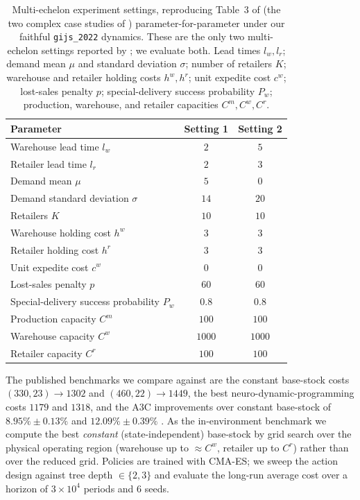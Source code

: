 \documentclass[11pt]{article}
\begin{document}
\begin{table}[!htbp]
\centering
\caption{Multi-echelon experiment settings, reproducing Table~3 of \citet{gijsbrechts2022drl} (the
two complex case studies of \citet{vanroy1997ndp}) parameter-for-parameter under our faithful
\texttt{gijs\_2022} dynamics. These are the only two multi-echelon settings reported by
\citet{gijsbrechts2022drl}; we evaluate both. Lead times $l_w,l_r$; demand mean $\mu$ and standard
deviation $\sigma$; number of retailers $K$; warehouse and retailer holding costs $h^w,h^r$; unit
expedite cost $c^w$; lost-sales penalty $p$; special-delivery success probability $P_w$; production,
warehouse, and retailer capacities $C^m,C^w,C^r$.}
\label{tab:me-params}
\begin{tabular}{lcc}
\toprule
Parameter & Setting 1 & Setting 2 \\
\midrule
\addlinespace[2pt]
Warehouse lead time $l_w$ & $2$ & $5$ \\
Retailer lead time $l_r$ & $2$ & $3$ \\
Demand mean $\mu$ & $5$ & $0$ \\
Demand standard deviation $\sigma$ & $14$ & $20$ \\
Retailers $K$ & $10$ & $10$ \\
\addlinespace[2pt]
Warehouse holding cost $h^w$ & $3$ & $3$ \\
Retailer holding cost $h^r$ & $3$ & $3$ \\
Unit expedite cost $c^w$ & $0$ & $0$ \\
Lost-sales penalty $p$ & $60$ & $60$ \\
Special-delivery success probability $P_w$ & $0.8$ & $0.8$ \\
\addlinespace[2pt]
Production capacity $C^m$ & $100$ & $100$ \\
Warehouse capacity $C^w$ & $1000$ & $1000$ \\
Retailer capacity $C^r$ & $100$ & $100$ \\
\bottomrule
\end{tabular}
\end{table}
\FloatBarrier

The published benchmarks we compare against are the constant base-stock costs $(330,23)\to 1302$
and $(460,22)\to 1449$, the best neuro-dynamic-programming costs $1179$ and $1318$, and the A3C
improvements over constant base-stock of $8.95\%\pm0.13\%$ and $12.09\%\pm0.39\%$
\citep{vanroy1997ndp, gijsbrechts2022drl}. As the in-environment benchmark we compute the best
\emph{constant} (state-independent) base-stock by grid search over the physical operating region
(warehouse up to $\approx C^w$, retailer up to $C^r$) rather than over the reduced grid. Policies
are trained with CMA-ES; we sweep the action design against tree depth $\in\{2,3\}$ and evaluate the
long-run average cost over a horizon of $3\times 10^4$ periods and $6$ seeds.
\end{document}
